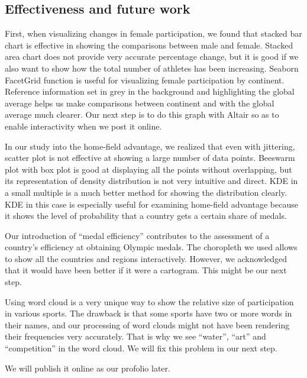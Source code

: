 \documentclass[12pt]{article}
\begin{document}
\subsection{Effectiveness and future work}
First, when visualizing changes in female participation, we found that stacked bar chart is effective in showing the comparisons between male and female. Stacked area chart does not provide very accurate percentage change, but it is good if we also want to show how the total number of athletes has been increasing. Seaborn FacetGrid function is useful for visualizing female participation by continent. Reference information set in grey in the background and highlighting the global average helps us make comparisons between continent and with the global average much clearer. Our next step is to do this graph with Altair so as to enable interactivity when we post it online. 

In our study into the home-field advantage, we realized that even with jittering, scatter plot is not effective at showing a large number of data points. Beeswarm plot with box plot is good at displaying all the points without overlapping, but its representation of density distribution is not very intuitive and direct. KDE in a small multiple is a much better method for showing the distribution clearly. KDE in this case is especially useful for examining home-field advantage because it shows the level of probability that a country gets a certain share of medals. 

Our introduction of “medal efficiency” contributes to the assessment of a country’s efficiency at obtaining Olympic medals. The choropleth we used allows to show all the countries and regions interactively. However, we acknowledged that it would have been better if it were a cartogram.  This might be our next step. 

Using word cloud is a very unique way to show the relative size of participation in various sports. The drawback is that some sports have two or more words in their names, and our processing of word clouds might not have been rendering their frequencies very accurately. That is why we see “water”, “art” and “competition” in the word cloud. We will fix this problem in our next step. 

We will publish it online as our profolio later. 
\end{document}
